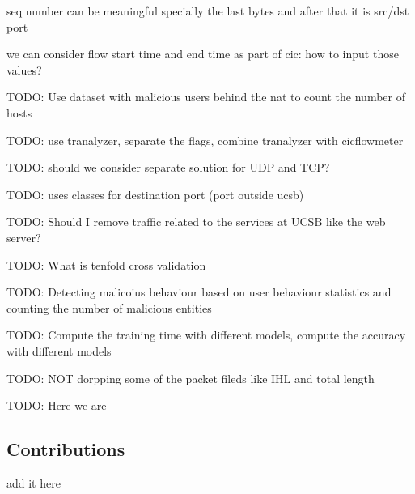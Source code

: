 seq number can be meaningful specially the last bytes and after that it is src/dst port 

we can consider flow start time and end time as part of cic: how to input those values? 


TODO: Use dataset with malicious users behind the nat to count the number of hosts

TODO: use tranalyzer, separate the flags, combine tranalyzer with cicflowmeter

TODO: should we consider separate solution for UDP and TCP? 

TODO: uses classes for destination port (port outside ucsb)

TODO: Should I remove traffic related to the services at UCSB like the web server?

TODO: What is tenfold cross validation

TODO: Detecting malicoius behaviour based on user behaviour statistics and counting the number of malicious entities 

TODO: Compute the training time with different models, compute the accuracy with different models

TODO: NOT dorpping some of the packet fileds like IHL and total length 

TODO: Here we are 


\subsection{Contributions}
add it here
